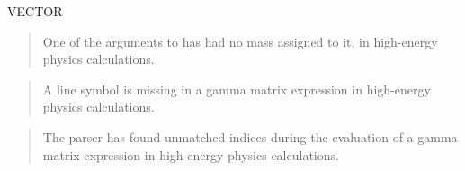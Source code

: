 \begin{Declaration}{VECTOR}
\begin{Comments}
 
\begin{quote}
One of the arguments to  has had no mass assigned to it, in
high-energy physics calculations.
\end{quote}

\begin{quote}
A line symbol is missing in a gamma matrix expression in high-energy physics
calculations.
\end{quote}

 
\begin{quote}
The parser has found unmatched indices during the evaluation of a
gamma matrix expression in high-energy physics calculations.
\end{quote}
\end{Comments}
\end{Declaration}

